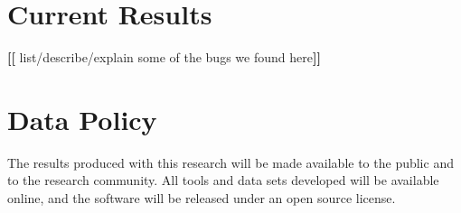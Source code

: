 \documentclass[11pt]{article}
\newcommand{\Fix}[1]{\textbf{[[}{\color{red} #1}\textbf{]]}}
\begin{document}
\section{Current Results}
\label{sec:results}

\Fix{list/describe/explain some of the bugs we found here}

\section{Data Policy}

The results produced with this research will be made available to the
public and to the research community.  All tools and data sets
developed will be available online, and the software will be released
under an open source license.


\footnotesize


\end{document}
